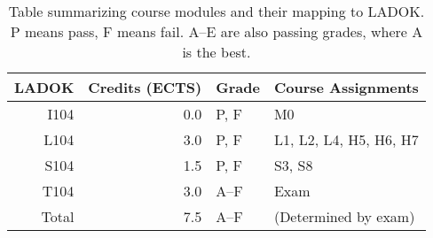\begin{table}
  \centering
  \setlength{\tabcolsep}{0.5em}
  \begin{tabular}{rrll}
    \toprule
    \textbf{LADOK}
    & \textbf{Credits (ECTS)}
    & \textbf{Grade}
    & \textbf{Course Assignments}
    \\
    \midrule
    I104  & 0.0             & P, F        & M0\\
    L104  & 3.0             & P, F        & L1, L2, L4, H5, H6, H7\\
    S104  & 1.5             & P, F        & S3, S8\\
    T104  & 3.0             & A--F        & Exam\\
    \midrule
    Total & 7.5             & A--F        & (Determined by exam)\\
    \bottomrule
  \end{tabular}
  \caption{%
    Table summarizing course modules and their mapping to LADOK\@.
    P means pass, F means fail.
    A--E are also passing grades, where A is the best.
  }\label{LADOKTable}
\end{table}
